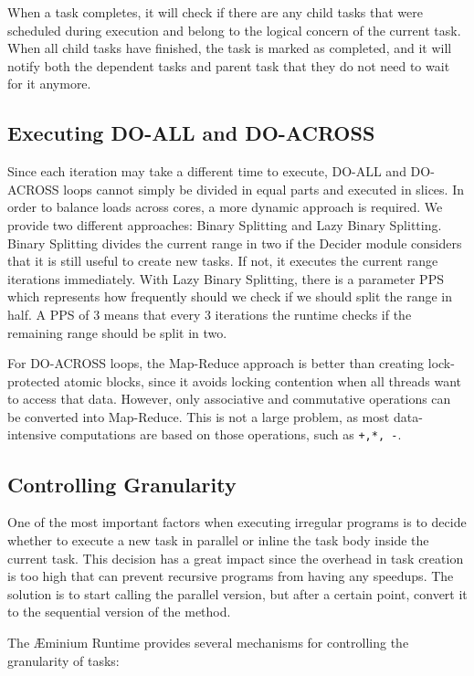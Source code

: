 \documentclass[smallextended]{svjour3}
\begin{document}
When a task completes, it will check if there are any child tasks that were scheduled during execution and belong to the logical concern of the current task. When all child tasks have finished, the task is marked as completed, and it will notify both the dependent tasks and parent task that they do not need to wait for it anymore.


\subsection{Executing DO-ALL and DO-ACROSS}

Since each iteration may take a different time to execute, DO-ALL and DO-ACROSS loops cannot simply be divided in equal parts and executed in slices. In order to balance loads across cores, a more dynamic approach is required. We provide two different approaches: Binary Splitting and Lazy Binary Splitting\cite{tzannes2010lazy}. Binary Splitting divides the current range in two if the Decider module considers that it is still useful to create new tasks. If not, it executes the current range iterations immediately. With Lazy Binary Splitting, there is a parameter PPS which represents how frequently should we check if we should split the range in half. A PPS of 3 means that every 3 iterations the runtime checks if the remaining range should be split in two.

For DO-ACROSS loops, the Map-Reduce approach is better than creating lock-protected atomic blocks, since it avoids locking contention when all threads want to access that data. However, only associative and commutative operations can be converted into Map-Reduce. This is not a large problem, as most data-intensive computations are based on those operations, such as \lstinline|+,*, -|.


\subsection{Controlling Granularity}

One of the most important factors when executing irregular programs is to decide whether to execute a new task in parallel or inline the task body inside the current task. This decision has a great impact since the overhead in task creation is too high that can prevent recursive programs from having any speedups. The solution is to start calling the parallel version, but after a certain point, convert it to the sequential version of the method.

The Æminium Runtime provides several mechanisms for controlling the granularity of tasks:
\end{document}
